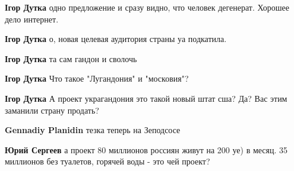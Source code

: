 \begin{itemize}
\begin{itemize}
 
\textbf{Ігор Дутка} одно предложение и сразу видно, что человек дегенерат. Хорошее дело интернет.

 
\textbf{Ігор Дутка} о, новая целевая аудитория страны уа подкатила.

 
\textbf{Ігор Дутка} та сам гандон и сволочь

 
\textbf{Ігор Дутка} Что такое "Лугандония" и "московия"?

 
\textbf{Ігор Дутка} А проект украгандония это такой новый штат сша? Да? Вас этим заманили страну продать?

 
\textbf{Gennadiy Planidin} тезка теперь на Зеподсосе

 
\textbf{Юрий Сергеев} а проект 80 миллионов россиян живут на 200 уе) в месяц. 35 миллионов без туалетов, горячей воды - это чей проект?


\end{itemize}
\end{itemize}
